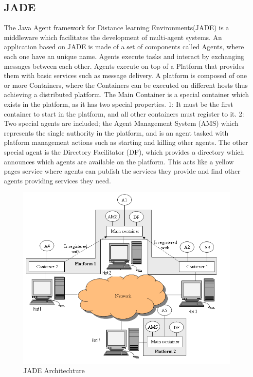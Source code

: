  \subsection{JADE}
 The Java Agent framework for Distance learning Environments(JADE) is a middleware which facilitates the development of multi-agent systems. An application based on JADE is made of a set of components called Agents, where each one have an unique name. Agents execute tasks and interact by exchanging messages between each other. Agents execute on top of a Platform that provides them with basic services such as message delivery. A platform is composed of one or more Containers, where the Containers can be executed on different hosts thus achieving a distributed platform. The Main Container is a special container which exists in the platform, as it has two special properties. 1: It must be the first container to start in the platform, and all other containers must register to it. 2: Two special agents are included; the Agent Management System (AMS) which represents the single authority in the platform, and is an agent tasked with platform management actions such as starting and killing other agents. The other special agent is the Directory Facilitator (DF), which provides a directory which announces which agents are available on the platform. This acts like a yellow pages service where agents can publish the services they provide and find other agents providing services they need.
 
 \begin{figure}[h!]
 	\centering
	 	\includegraphics[width=\textwidth]{fig/jadeArchitecture}
	 	\caption{JADE Architechture}
	 	\label{fig:JADEarchitechture}
 \end{figure}

\cleardoublepage
